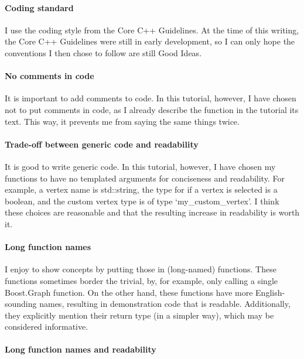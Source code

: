 \paragraph{Coding standard}

I use the coding style from the Core C++ Guidelines.
At the time of this writing, the Core C++ Guidelines were still in early
development, so I can only hope the conventions I then chose to follow
are still Good Ideas.

\paragraph{No comments in code}

It is important to add comments to code.
In this tutorial, however, I have chosen not to put comments in code, as
I already describe the function in the tutorial its text.
This way, it prevents me from saying the same things twice.

\paragraph{Trade-off between generic code and readability}

It is good to write generic code.
In this tutorial, however, I have chosen my functions to have no templated
arguments for conciseness and readability.
For example, a vertex name is std::string, the type for if a vertex is
selected is a boolean, and the custom vertex type is of type `my_custom_vertex'.
I think these choices are reasonable and that the resulting increase in
readability is worth it.

\paragraph{Long function names}

I enjoy to show concepts by putting those in (long-named) functions.
These functions sometimes border the trivial, by, for example, only calling
a single Boost.Graph function.
On the other hand, these functions have more English-sounding names, resulting
in demonstration code that is readable.
Additionally, they explicitly mention their return type (in a simpler way),
which may be considered informative.

\paragraph{Long function names and readability}

